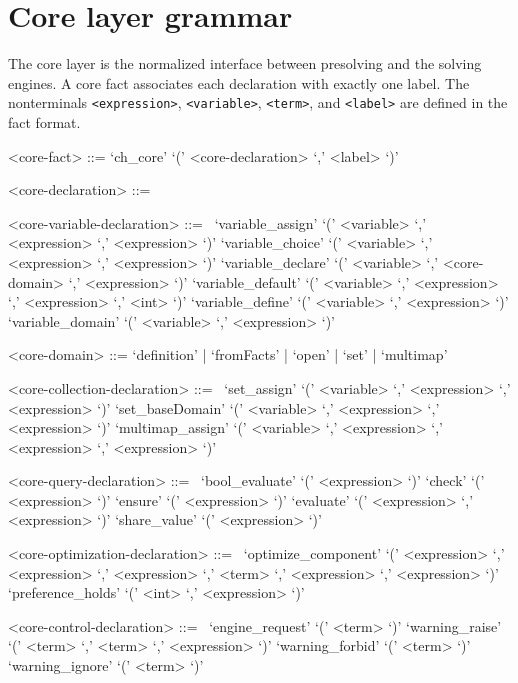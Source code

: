 \section{Core layer grammar}

The core layer is the normalized interface between presolving and the solving
engines.  A core fact associates each declaration with exactly one label.
The nonterminals \texttt{<expression>}, \texttt{<variable>}, \texttt{<term>},
and \texttt{<label>} are defined in the fact format.

\begin{grammar}
<core-fact> ::= `ch_core' `(' <core-declaration> `,' <label> `)'

<core-declaration> ::=
~

<core-variable-declaration> ::=
~\alt `variable_assign' `(' <variable> `,' <expression> `,' <expression> `)'
\alt `variable_choice' `(' <variable> `,' <expression> `,' <expression> `)'
\alt `variable_declare' `(' <variable> `,' <core-domain> `,' <expression> `)'
\alt `variable_default' `(' <variable> `,' <expression> `,' <expression> `,' <int> `)'
\alt `variable_define' `(' <variable> `,' <expression> `)'
\alt `variable_domain' `(' <variable> `,' <expression> `)'

<core-domain> ::= `definition' | `fromFacts' | `open' | `set' | `multimap'

<core-collection-declaration> ::=
~\alt `set_assign' `(' <variable> `,' <expression> `,' <expression> `)'
\alt `set_baseDomain' `(' <variable> `,' <expression> `,' <expression> `)'
\alt `multimap_assign' `(' <variable> `,' <expression> `,' <expression> `,' <expression> `)'

<core-query-declaration> ::=
~\alt `bool_evaluate' `(' <expression> `)'
\alt `check' `(' <expression> `)'
\alt `ensure' `(' <expression> `)'
\alt `evaluate' `(' <expression> `,' <expression> `)'
\alt `share_value' `(' <expression> `)'

<core-optimization-declaration> ::=
~\alt `optimize_component' `(' <expression> `,' <expression> `,' <expression> `,' <term> `,' <expression> `,' <expression> `)'
\alt `preference_holds' `(' <int> `,' <expression> `)'

<core-control-declaration> ::=
~\alt `engine_request' `(' <term> `)'
\alt `warning_raise' `(' <term> `,' <term> `,' <expression> `)'
\alt `warning_forbid' `(' <term> `)'
\alt `warning_ignore' `(' <term> `)'
\end{grammar}
